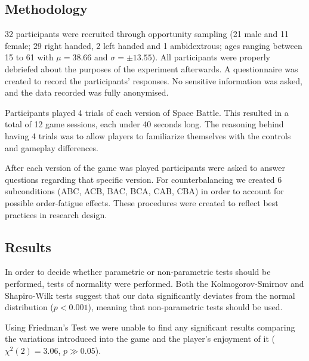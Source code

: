 \subsection{Methodology}

32 participants were recruited through opportunity sampling (21 male and 11 female; 29 right handed, 2 left handed and 1 ambidextrous; ages ranging between 15 to 61 with $\mu= 38.66$ and  $\sigma = \pm 13.55$). All participants were properly debriefed about the purposes of the experiment afterwards. A questionnaire was created to record the participants' responses. No sensitive information was asked, and the data recorded was fully anonymised. 

Participants played 4 trials of each version of Space Battle. This resulted in a total of 12 game sessions, each under 40 seconds long. The reasoning behind having 4 trials was to allow players to familiarize themselves with the controls and gameplay differences. 

After each version of the game was played participants were asked to answer questions regarding that specific version. For counterbalancing we created 6 subconditions (ABC, ACB, BAC, BCA, CAB, CBA) in order to account for possible order-fatigue effects. These procedures were created to reflect best practices in research design.


\subsection{Results}

In order to decide whether parametric or non-parametric tests should be performed, tests of normality were performed. Both the Kolmogorov-Smirnov and Shapiro-Wilk tests suggest that our data significantly deviates from the normal distribution ($p < 0.001$), meaning that non-parametric tests should be used.

Using Friedman's Test we were unable to find any significant results comparing the variations introduced into the game and the player's enjoyment of it ($\chi^2(2) = 3.06$, $p \gg 0.05$).
